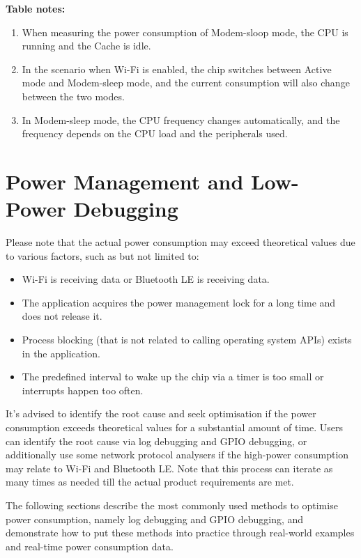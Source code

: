 \documentclass[a4paper,12pt]{book}
\begin{document}
\textbf{Table notes:}

\begin{enumerate}[label=$^\arabic*$]
    \item When measuring the power consumption of Modem-sloop mode, the CPU is running and the Cache is idle.
    \item In the scenario when Wi-Fi is enabled, the chip switches between Active mode and Modem-sleep mode, and the current consumption will also change between the two modes.
    \item In Modem-sleep mode, the CPU frequency changes automatically, and the frequency depends on the CPU load and the peripherals used.
\end{enumerate}

\section{Power Management and Low-Power Debugging}
Please note that the actual power consumption may exceed theoretical values due to various factors, such as but not limited to:

\begin{itemize}
    \item Wi-Fi is receiving data or Bluetooth LE is receiving data.
    \item The application acquires the power management lock for a long time and does not release it.
    \item Process blocking (that is not related to calling operating system APIs) exists in the application.
    \item The predefined interval to wake up the chip via a timer is too small or interrupts happen too often.
\end{itemize}

It’s advised to identify the root cause and seek optimisation if the power consumption exceeds theoretical values for a substantial amount of time. Users can identify the root cause via log debugging and GPIO debugging, or additionally use some network protocol analysers if the high-power consumption may relate to Wi-Fi and Bluetooth LE. Note that this process can iterate as many times as needed till the actual product requirements are met.

The following sections describe the most commonly used methods to optimise power consumption, namely log debugging and GPIO debugging, and demonstrate how to put these methods into practice through real-world examples and real-time power consumption data.
\end{document}
